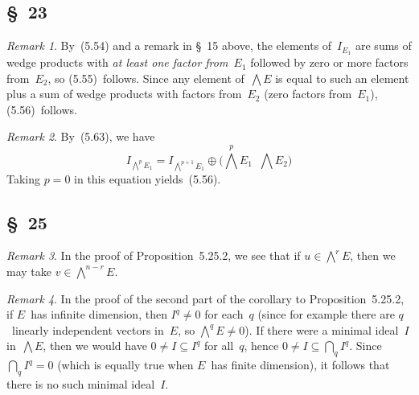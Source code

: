 \documentclass[letterpaper,12pt]{article}
\newcommand{\bigsect}{\bigcap}
\newcommand{\dsum}{\oplus}
\newcommand{\stprod}{\mathop{\widehat{\otimes}}}
\newcommand{\bigeprod}{\bigwedge}
\newcommand{\medeprod}{{\textstyle\bigeprod}}
\theoremstyle{definition}
\theoremstyle{remark}
\newtheorem*{rmk}{Remark}
\begin{document}
\subsection*{\S~23}
\begin{rmk}
By~(5.54) and a remark in \S~15 above, the elements of~\(I_{E_1}\) are sums of wedge products with \emph{at least one factor from~\(E_1\)} followed by zero or more factors from~\(E_2\), so (5.55)~follows. Since any element of~\(\medeprod E\) is equal to such an element plus a sum of wedge products with factors from~\(E_2\) (zero factors from~\(E_1\)), (5.56)~follows.
\end{rmk}

\begin{rmk}
By~(5.63), we have
\[I_{\bigeprod^p E_1}=I_{\bigeprod^{p+1}E_1}\dsum\bigl(\medeprod^p E_1\stprod\medeprod E_2\bigr)\]
Taking \(p=0\) in this equation yields~(5.56).
\end{rmk}

\subsection*{\S~25}
\begin{rmk}
In the proof of Proposition~5.25.2, we see that if \(u\in\medeprod^r E\), then we may take \(v\in\medeprod^{n-r}E\).
\end{rmk}

\begin{rmk}
In the proof of the second part of the corollary to Proposition~5.25.2, if \(E\)~has infinite dimension, then \(I^q\ne 0\) for each~\(q\) (since for example there are \(q\)~linearly independent vectors in~\(E\), so \(\medeprod^q E\ne 0\)). If there were a minimal ideal~\(I\) in~\(\medeprod E\), then we would have \(0\ne I\subseteq I^q\) for all~\(q\), hence \(0\ne I\subseteq\bigsect_q I^q\). Since \(\bigsect_q I^q=0\) (which is equally true when \(E\)~has finite dimension), it follows that there is no such minimal ideal~\(I\).
\end{rmk}
\end{document}
